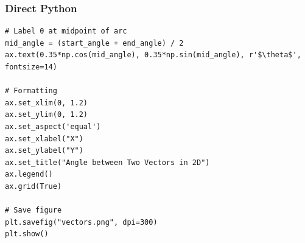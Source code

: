 \documentclass{beamer}
\begin{document}
\begin{frame}[fragile]
\frametitle{Direct Python }
\begin{lstlisting}
# Label θ at midpoint of arc
mid_angle = (start_angle + end_angle) / 2
ax.text(0.35*np.cos(mid_angle), 0.35*np.sin(mid_angle), r'$\theta$', fontsize=14)

# Formatting
ax.set_xlim(0, 1.2)
ax.set_ylim(0, 1.2)
ax.set_aspect('equal')
ax.set_xlabel("X")
ax.set_ylabel("Y")
ax.set_title("Angle between Two Vectors in 2D")
ax.legend()
ax.grid(True)

# Save figure
plt.savefig("vectors.png", dpi=300)
plt.show()

\end{lstlisting}
\end{frame}
\end{document}
